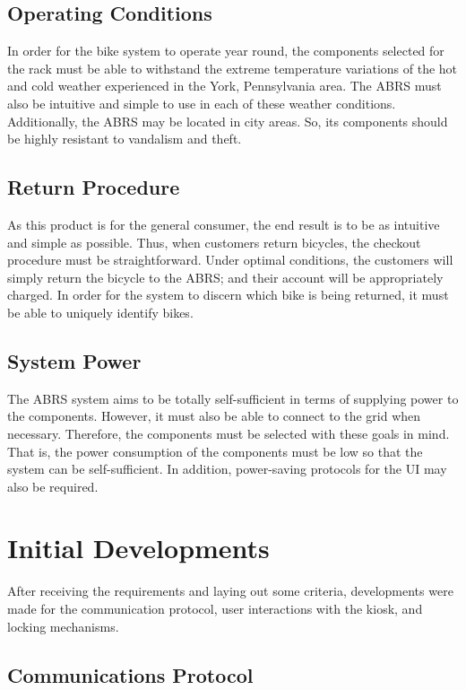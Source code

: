 \documentclass[11pt,a4paper,onesides]{report}
\begin{document}
\section{Operating Conditions}

In order for the bike system to operate year round, the components selected for the rack must be able to withstand the extreme temperature variations of the hot and cold weather experienced in the York, Pennsylvania area.  The ABRS must also be intuitive and simple to use in each of these weather conditions.  Additionally, the ABRS may be located in city areas.  So, its components should be highly resistant to vandalism and theft. 

\section{Return Procedure}

As this product is for the general consumer, the end result is to be as intuitive and simple as possible.  Thus, when customers return bicycles, the checkout procedure must be straightforward.  Under optimal conditions, the customers will simply return the bicycle to the ABRS; and their account will be appropriately charged.  In order for the system to discern which bike is being returned, it must be able to uniquely identify bikes.

\section{System Power}

 The ABRS system aims to be totally self-sufficient in terms of supplying power to the components.  However, it must also be able to connect to the grid when necessary.  Therefore, the components must be selected with these goals in mind.  That is, the power consumption of the components must be low so that the system can be self-sufficient.  In addition, power-saving protocols for the UI may also be required.  

\chapter{Initial Developments}

After receiving the requirements and laying out some criteria, developments were made for the communication protocol, user interactions with the kiosk, and locking mechanisms.

\section{Communications Protocol}
\end{document}
